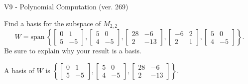 \begin{exercise}
  \begin{exerciseTitle}V9 - Polynomial Computation (ver. 269)\end{exerciseTitle}
  \begin{exerciseStatement}
    Find a basis for the subspace of \(M_{2,2}\) 
\[W=\mathrm{span}\ \left\{\left[\begin{array}{cc}
0 & 1 \\
5 & -5
\end{array}\right] , \left[\begin{array}{cc}
5 & 0 \\
4 & -5
\end{array}\right] , \left[\begin{array}{cc}
28 & -6 \\
2 & -13
\end{array}\right] , \left[\begin{array}{cc}
-6 & 2 \\
2 & 1
\end{array}\right] , \left[\begin{array}{cc}
5 & 0 \\
4 & -5
\end{array}\right]\right\}.\]
 Be sure to explain why your result is a basis.


  \end{exerciseStatement}
  \begin{exerciseAnswer}
   A basis of \(W\) is  \(\left\{\left[\begin{array}{cc}
0 & 1 \\
5 & -5
\end{array}\right] , \left[\begin{array}{cc}
5 & 0 \\
4 & -5
\end{array}\right] , \left[\begin{array}{cc}
28 & -6 \\
2 & -13
\end{array}\right]\right\}\).
  


  \end{exerciseAnswer}
\end{exercise}